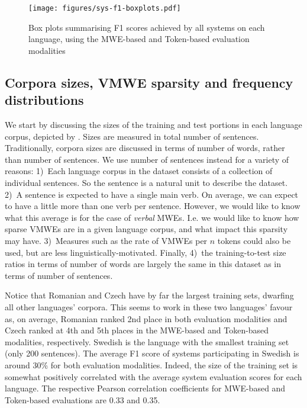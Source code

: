 \documentclass[output=paper
,modfonts
,nonflat,draftmode]{langsci/langscibook}
\begin{document}
\begin{figure}
\texttt{[image: figures/sys-f1-boxplots.pdf]}
\caption{\label{fig:sys-f1-boxplots}Box plots summarising F1 scores achieved by all systems on each language, using the MWE-based and Token-based evaluation modalities}
\end{figure}

\subsection{\label{sec:corpus-overview}Corpora sizes, VMWE sparsity and frequency distributions}

We start by discussing the sizes of the training and test portions in each language corpus, depicted by . Sizes are measured in total number of sentences. Traditionally, corpora sizes are discussed in terms of number of words, rather than number of sentences. We use number of sentences instead for a variety of reasons: 1)~Each language corpus in the dataset consists of a collection of individual sentences. So the sentence is a natural unit to describe the dataset. 2)~A sentence is expected to have a single main verb. On average, we can expect to have a little more than one verb per sentence. However, we would like to know what this average is for the case of \emph{verbal} MWEs. I.e. we would like to know how sparse VMWEs are in a given language corpus, and what impact this sparsity may have. 3)~Measures such as the rate of VMWEs per $n$ tokens could also be used, but are less linguistically-motivated. Finally, 4)~the training-to-test size ratios in terms of number of words are largely the same in this dataset as in terms of number of sentences. 

Notice that Romanian and Czech have by far the largest training sets, dwarfing all other languages' corpora. This seems to work in these two languages' favour as, on average, Romanian ranked 2nd place in both evaluation modalities and Czech ranked at 4th and 5th places in the MWE-based and Token-based modalities, respectively. Swedish is the language with the smallest training set (only 200 sentences). The average F1 score of systems participating in Swedish is around 30\% for both evaluation modalities. Indeed, the size of the training set is somewhat positively correlated with the average system evaluation scores for each language. The respective Pearson correlation coefficients for MWE-based and Token-based evaluations are 0.33 and 0.35.
\end{document}
